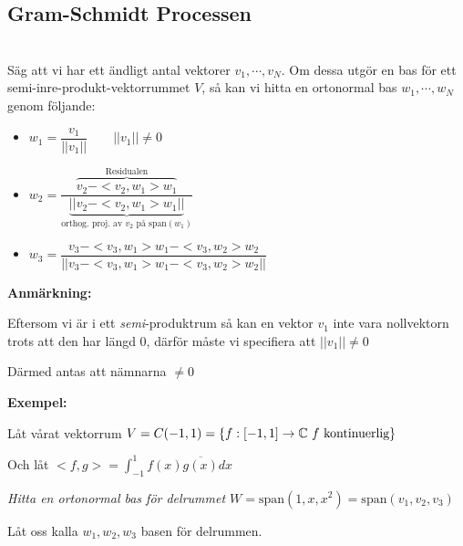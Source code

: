 \subsection{Gram-Schmidt Processen}\hfill\\
\noindent Säg att vi har ett ändligt antal vektorer $v_1,\cdots,v_N$. Om dessa utgör en bas för ett semi-inre-produkt-vektorrummet $V$, så kan vi hitta en ortonormal bas $w_1,\cdots,w_N$  genom följande:\par
\begin{itemize}
  \item $w_1 = \dfrac{v_1}{\left|\left|v_1\right|\right|}\qquad \left|\left|v_1\right|\right|\neq0$
    \par\bigskip
  \item $w_2 = \dfrac{\overbrace{v_2-<v_2,w_1>w_1}^{\text{Residualen}}}{\underbrace{\left|\left|v_2-<v_2,w_1>w_1\right|\right|}_{\text{orthog. proj. av $v_2$ på span$(w_1)$}}}$
    \par\bigskip
  \item $w_3 = \dfrac{v_3-<v_3,w_1>w_1-<v_3,w_2>w_2}{\left|\left|v_3-<v_3,w_1>w_1-<v_3,w_2>w_2\right|\right|}$
\end{itemize}
\par\bigskip
\noindent\textbf{Anmärkning:}\par
\noindent Eftersom vi är i ett \textit{semi}-produktrum så kan en vektor $v_1$ inte vara nollvektorn trots att den har längd 0, därför måste vi specifiera att $\left|\left|v_1\right|\right|\neq0$ \par
\noindent Därmed antas att nämnarna $\neq0$
\par\bigskip
\noindent\textbf{Exempel:}\par
\noindent Låt vårat vektorrum $V = C(-1,1) = \left\{f:[-1,1]\to\mathbb{C}\text{ $f$ kontinuerlig}\right\}$\par
\noindent Och låt $<f,g> = \int_{-1}^{1}f(x)\overline{g(x)}dx$
\par\bigskip
\noindent\textit{Hitta en ortonormal bas för delrummet $W = \text{span}(1,x,x^2) = \text{span}(v_1,v_2,v_3)$}
\par\bigskip
\noindent Låt oss kalla $w_1,w_2,w_3$ basen för delrummen.\par
